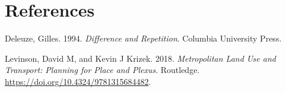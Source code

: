 \documentclass[12pt,]{article}
\begin{document}
\hypertarget{references}{%
\section*{References}\label{references}}

\hypertarget{refs}{}
\leavevmode\hypertarget{ref-deleuze1994difference}{}%
Deleuze, Gilles. 1994. \emph{Difference and Repetition}. Columbia
University Press.

\leavevmode\hypertarget{ref-levinson2018metropolitan}{}%
Levinson, David M, and Kevin J Krizek. 2018. \emph{Metropolitan Land Use
and Transport: Planning for Place and Plexus}. Routledge.
\url{https://doi.org/10.4324/9781315684482}.
\end{document}
